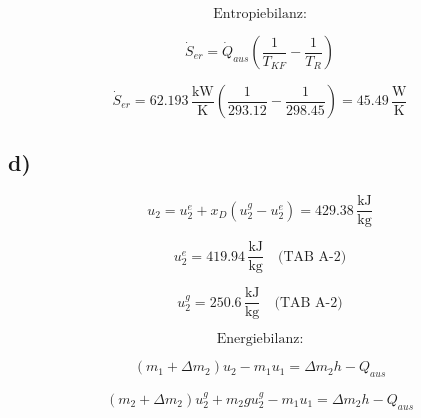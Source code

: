 \[
\text{Entropiebilanz:}
\]

\[
\dot{S}_{er} = \dot{Q}_{aus} \left( \frac{1}{T_{KF}} - \frac{1}{T_R} \right)
\]

\[
\dot{S}_{er} = 62.193 \, \frac{\text{kW}}{\text{K}} \left( \frac{1}{293.12} - \frac{1}{298.45} \right) = 45.49 \, \frac{\text{W}}{\text{K}}
\]

\subsection*{d)}

\[
u_2 = u_2^e + x_D (u_2^g - u_2^e) = 429.38 \, \frac{\text{kJ}}{\text{kg}}
\]

\[
u_2^e = 419.94 \, \frac{\text{kJ}}{\text{kg}} \quad \text{(TAB A-2)}
\]

\[
u_2^g = 250.6 \, \frac{\text{kJ}}{\text{kg}} \quad \text{(TAB A-2)}
\]

\[
\text{Energiebilanz:}
\]

\[
(m_1 + \Delta m_2) u_2 - m_1 u_1 = \Delta m_2 h - Q_{aus}
\]

\[
(m_2 + \Delta m_2) u_2^g + m_2 g u_2^g - m_1 u_1 = \Delta m_2 h - Q_{aus}
\]


